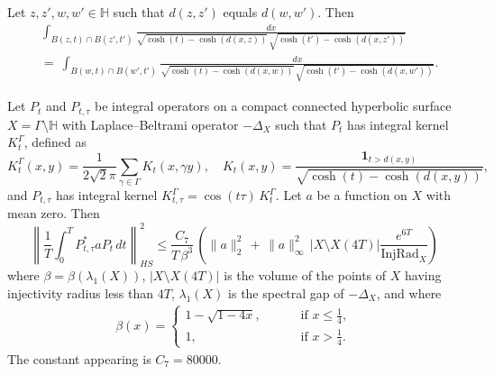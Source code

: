 \documentclass[10pt,a4paper]{amsart}
\begin{document}
\begin{lemma}[]
	\label{Lmm: Points do not matter}
	Let $ z,z', w, w' \in \mathbb{H} $ such that $ d( z,z' ) $ equals $ d( w,w' ) $. Then
	\begin{align}
		&
	     \nonumber
		\int_{ B( z,t ) \cap B( z', t' ) } \frac{dx}{ \sqrt{ \cosh( t ) - \cosh( d( x,z ) )  } \, \sqrt{ \cosh( t' ) - \cosh( d( x,z' ) ) } }	
	     \\ & = \ 
		\label{Expr: z z' integral}
		\int_{ B( w,t ) \cap B( w', t' ) } \frac{dx}{ \sqrt{ \cosh( t ) - \cosh( d( x,w ) )  } \, \sqrt{ \cosh( t' ) - \cosh( d( x,w' ) ) } }.
	\end{align}
		
\end{lemma}

\begin{proposition}
\label{Prp: Geometric data}

Let $P_t$ and $P_{t,\tau}$ be integral operators on a compact connected hyperbolic surface $X = \Gamma \setminus \mathbb{H}$ with Laplace--Beltrami operator $ -\Delta_{X} $ such that $ P_{t} $ has integral kernel $ K_{t}^{\Gamma} $, defined as
\[
K_t^\Gamma(x,y) = \frac{1}{2 \sqrt{2} \pi} \sum_{\gamma \in \Gamma} K_t(x, \gamma y), \quad
K_t(x,y) = \frac{\mathbf{1}_{t > d(x,y)}}{\sqrt{\cosh(t) - \cosh(d(x,y))}},
\]
and $ P_{t,\tau} $ has integral kernel $K_{t,\tau}^{\Gamma} = \cos(t \tau) \, K_t^\Gamma$. Let $ a $ be a function on $ X $ with mean zero. Then
\[
	\left\| \frac{1}{T} \int_0^T P_{t,\tau}^{*} a P_t \, dt \right\|_{HS}^{2} \leq \frac{C_{7}}{T \, \beta^{3}} \, \left( \| a \|_{2}^{2} \, + \,  \| a \|_{\infty}^{2} \, | X \setminus X( 4T ) | \frac{e^{6 T}}{ \operatorname{InjRad}_{X} } \right)
\]
where $ \beta = \beta( \lambda_{1}( X ) ) $,  $|X \setminus X( 4T )|$  is the volume of the points of $ X $ having injectivity radius less than $ 4T $, $ \lambda_{1}( X ) $ is the spectral gap of $ -\Delta_{X} $, and where
\begin{align*}
	\beta( x ) = 
	\begin{cases}	
		1 - \sqrt{ 1 - 4x }, \qquad & \text{ if } x \leq \frac{1}{4},
		\\
		1, \qquad & \text{ if } x > \frac{1}{4}.
	\end{cases}
\end{align*}
The constant appearing is $C_{7} = 80000$.

\end{proposition}
\end{document}
